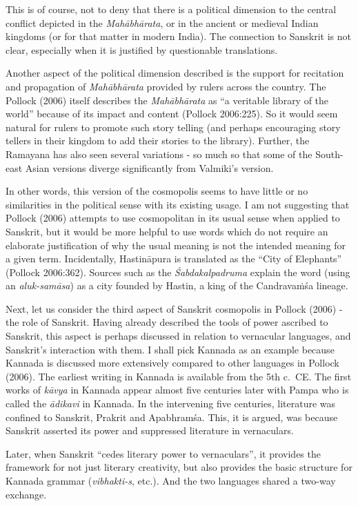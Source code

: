 This is of course, not to deny that there is a political dimension to the central conflict depicted in the {\sl Mahābhārata}, or in the ancient or medieval Indian kingdoms (or for that matter in modern India). The connection to Sanskrit is not clear, especially when it is justified by questionable translations. 

Another aspect of the political dimension described is the support for recitation and propagation of {\sl Mahābhārata} provided by rulers across the country. The Pollock (2006) itself describes the {\sl Mahābhārata} as “a veritable library of the world” because of its impact and content (Pollock 2006:225). So it would seem natural for rulers to promote such story telling (and perhaps encouraging story tellers in their kingdom to add their stories to the library).  Further, the Ramayana has also seen several variations - so much so that some of the South-east Asian versions diverge significantly from Valmiki’s version. 

In other words, this version of the cosmopolis seems to have little or no similarities in the political sense with its existing usage. I am not suggesting that Pollock (2006) attempts to use cosmopolitan in its usual sense when applied to Sanskrit, but it would be more helpful to use words which do not require an elaborate justification of why the usual meaning is not the intended meaning for a given term. Incidentally, Hastināpura is translated as the “City of Elephants” (Pollock 2006:362). Sources such as the {\sl Śabdakalpadruma} explain the word (using an {\sl aluk-samāsa}) as a city founded by Hastin, a king of the Candravaṁśa lineage.

Next, let us consider the third aspect of Sanskrit cosmopolis in Pollock (2006) - the role of Sanskrit. Having already described the tools of power ascribed to Sanskrit, this aspect is perhaps discussed in relation to vernacular languages, and Sanskrit’s interaction with them. I shall pick Kannada as an example because Kannada is discussed more extensively compared to other languages in Pollock (2006). The earliest writing in Kannada is available from the 5th c.\ CE. The first works of {\sl kāvya} in Kannada appear almost five centuries later with Pampa who is called the {\sl ādikavi} in Kannada. In the intervening five centuries, literature was confined to Sanskrit, Prakrit and Apabhramśa. This, it is argued, was because Sanskrit asserted its power and suppressed literature in vernaculars.

Later, when Sanskrit “cedes literary power to vernaculars”, it provides the framework for not just literary creativity, but also provides the basic structure for Kannada grammar ({\sl vibhakti-s}, etc.). And the two languages shared a two-way exchange. 

